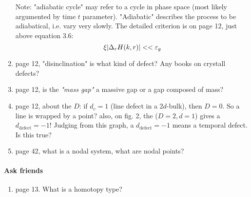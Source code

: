 \documentclass{article}
\begin{document}
\begin{enumerate}
        Note: "adiabatic cycle" may refer to a cycle in phase space
        (most likely argumented by time $t$ parameter). "Adiabatic"
        describes the process to be adiabatical, i.e. vary very
        slowly. The detailed criterion is on page 12, just above
        equation 3.6:
        \begin{equation}
            \xi \abs{\Delta_r H(k,r)}<<\varepsilon_g
        \end{equation}
    \item page 12, "disinclination" is what kind of defect? Any books
        on crystall defects?
    \item page 12, is the \textit{"mass gap"} a massive gap or a gap
        composed of mass?
    \item page 12, about the $D$: if $d_c=1$ (line defect in a
        $2d$-bulk), then $D=0$. So a line is wrapped by a point?
        also, on fig. 2, the ($D=2,d=1$) gives a $d_\text{defect}=-1$!
        Judging from this graph, a $d_\text{defect}=-1$ means a
        temporal defect. Is this true?
    \item page 42, what is a nodal system, what are nodal points?
\end{enumerate}

\paragraph{Ask friends}
\begin{enumerate}
    \item page 13. What is a homotopy type?
\end{enumerate}
\end{document}
